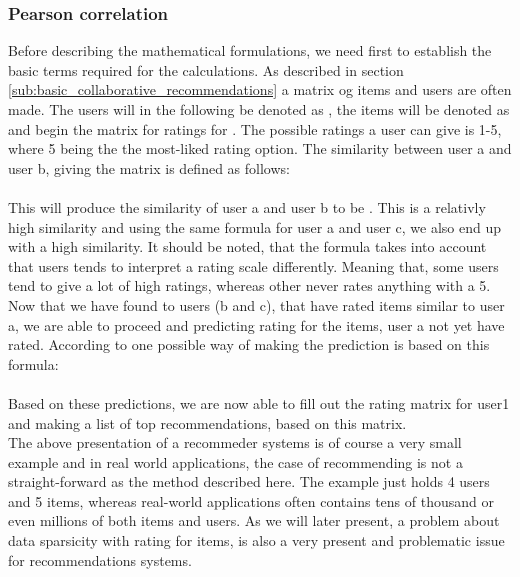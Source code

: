 \subsubsection{Pearson correlation}
Before describing the mathematical formulations, we need first to establish the basic terms required for the calculations. As described in section \ref{sub:basic_collaborative_recommendations} a matrix og items and users are often made. The users will in the following be denoted as , the items will be denoted as  and  begin the matrix  for ratings  for . The possible ratings a user can give is 1-5, where 5 being the the most-liked rating option. 
The similarity between user a and user b, giving the matrix  is defined as follows:\\

\\

This will produce the similarity of user a and user b to be . This is a relativly high similarity and using the same formula for user a and user c, we also end up with a high similarity. It should be noted, that the formula takes into account that users tends to interpret a rating scale differently. Meaning that, some users tend to give a lot of high ratings, whereas other never rates anything with a 5. 
Now that we have found to users (b and c), that have rated items similar to user a, we are able to proceed and predicting rating for the items, user a not yet have rated. According to  one possible way of making the prediction is based on this formula:\\

\\

Based on these predictions, we are now able to fill out the rating matrix for user1 and making a list of top recommendations, based on this matrix. \\

The above presentation of a recommeder systems is of course a very small example and in real world applications, the case of recommending is not a straight-forward as the method described here. The example just holds 4 users and 5 items, whereas real-world applications often contains tens of thousand or even millions of both items and users. As we will later present, a problem about data sparsicity with rating for items, is also a very present and problematic issue for recommendations systems.  

